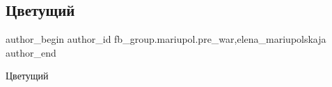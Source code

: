  
 
 
 
 

\subsection{Цветущий}
\label{sec:11_02_2023.fb.fb_group.mariupol.pre_war.9.tsvetushchii}
 
\ifcmt
 author_begin
   author_id fb_group.mariupol.pre_war,elena_mariupolskaja
 author_end
\fi

Цветущий


